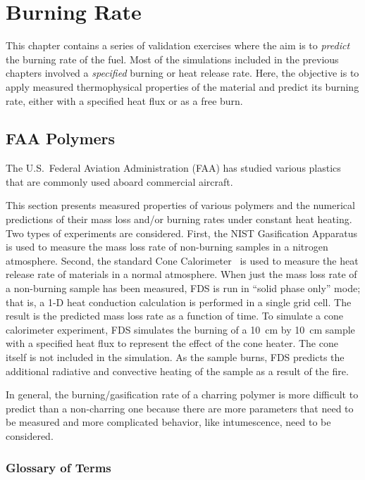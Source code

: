 
\chapter{Burning Rate}

This chapter contains a series of validation exercises where the aim is to {\em predict} the burning rate of the fuel. Most of the simulations included in the previous chapters involved
a {\em specified} burning or heat release rate. Here, the objective is to apply measured thermophysical properties of the material and predict its burning rate, either with a
specified heat flux or as a free burn.



\section{FAA Polymers}\label{sec_FAA_Polymers}

The U.S.~Federal Aviation Administration (FAA) has studied various plastics that are commonly used aboard commercial aircraft.

This section presents measured properties of various polymers and the numerical predictions of their mass loss and/or burning rates under constant heat heating.
Two types of experiments are considered. First, the NIST Gasification Apparatus is used to measure the mass loss rate of non-burning samples in a nitrogen atmosphere.
Second, the standard Cone Calorimeter~\cite{conecal} is used to measure the heat release rate of materials in a normal atmosphere.
When just the mass loss rate of a non-burning sample has been measured, FDS is run in ``solid phase only'' mode; that is, a 1-D heat conduction calculation is performed in a
single grid cell. The result is the predicted mass loss rate as a function of time. To simulate a cone calorimeter experiment, FDS simulates the burning of a 10~cm by 10~cm sample with
a specified heat flux to represent the effect of the cone heater. The cone itself is not included in the simulation. As the sample burns, FDS predicts the additional radiative and
convective heating of the sample as a result of the fire.

In general, the burning/gasification rate of a charring polymer is more difficult to predict than a non-charring one because there are more parameters that need to be measured and
more complicated behavior, like intumescence, need to be considered.

\subsection{Glossary of Terms}
\label{glossary}

